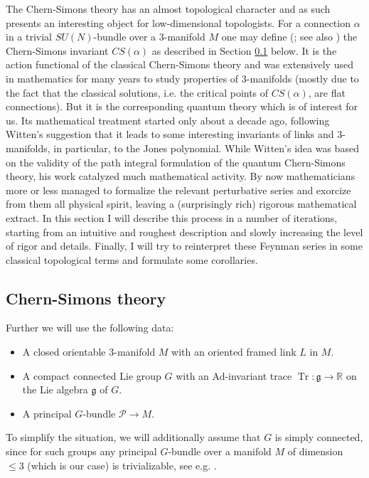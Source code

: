 \documentclass[10pt]{amsart}
\theoremstyle{definition}
\theoremstyle{remark}
\newcommand{\R}{\mathbb R}
\newcommand{\cP}{\mathcal{P}}
\newcommand{\fG}{\mathfrak{g}}
\newcommand{\Ga}{\alpha}
\newcommand{\Tr}{\operatorname{Tr}}
\begin{document}
The Chern-Simons theory has an almost topological character and as
such presents an interesting object for low-dimensional topologists.
For a connection $\Ga$ in a trivial $SU(N)$-bundle over a 3-manifold
$M$ one may define (\cite{CS}; see also \cite{F}) the Chern-Simons
invariant $CS(\Ga)$ as described in Section \ref{sub:CStheory} below.
It is the action functional of the classical Chern-Simons theory and
was extensively used in mathematics for many years to study properties
of 3-manifolds (mostly due to the fact that the classical solutions,
i.e. the critical points of $CS(\Ga)$, are flat connections). But it
is the corresponding quantum theory which is of interest for us.
Its mathematical treatment started only about a decade ago, following
Witten's suggestion \cite{W} that it leads to some interesting invariants
of links and $3$-manifolds, in particular, to the Jones polynomial.
While Witten's idea was based on the validity of the path integral
formulation of the quantum Chern-Simons theory, his work catalyzed
much mathematical activity. By now mathematicians more or less managed
to formalize the relevant perturbative series and exorcize from them
all physical spirit, leaving a (surprisingly rich) rigorous mathematical
extract. In this section I will describe this process in a number of
iterations, starting from an intuitive and roughest description
and slowly increasing the level of rigor and details. Finally, I
will try to reinterpret these Feynman series in some classical
topological terms and formulate some corollaries.

\subsection{Chern-Simons theory}\label{sub:CStheory}
Further we will use the following data:
\begin{itemize}
\item A closed orientable 3-manifold $M$ with an oriented framed
      link $L$ in $M$.
\item A compact connected Lie group $G$ with an Ad-invariant trace
      $\Tr:\fG\to\R$ on the Lie algebra $\fG$ of $G$.
\item A principal $G$-bundle $\cP\to M$.
\end{itemize}

To simplify the situation, we will additionally assume that $G$ is
simply connected, since for such groups any principal $G$-bundle
over a manifold $M$ of dimension $\le 3$ (which is our case) is
trivializable, see e.g. \cite{F}.
\end{document}
